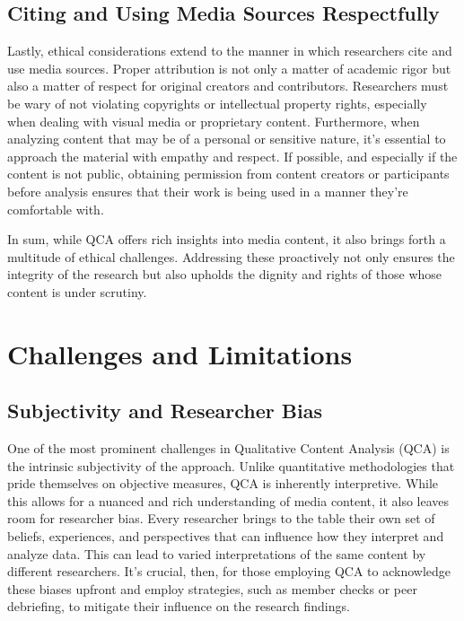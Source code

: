 \documentclass[
  b5paper]{book}
\begin{document}
\hypertarget{citing-and-using-media-sources-respectfully}{%
\subsection*{Citing and Using Media Sources Respectfully}\label{citing-and-using-media-sources-respectfully}}

Lastly, ethical considerations extend to the manner in which researchers cite and use media sources. Proper attribution is not only a matter of academic rigor but also a matter of respect for original creators and contributors. Researchers must be wary of not violating copyrights or intellectual property rights, especially when dealing with visual media or proprietary content. Furthermore, when analyzing content that may be of a personal or sensitive nature, it's essential to approach the material with empathy and respect. If possible, and especially if the content is not public, obtaining permission from content creators or participants before analysis ensures that their work is being used in a manner they're comfortable with.

In sum, while QCA offers rich insights into media content, it also brings forth a multitude of ethical challenges. Addressing these proactively not only ensures the integrity of the research but also upholds the dignity and rights of those whose content is under scrutiny.

\hypertarget{challenges-and-limitations}{%
\section{Challenges and Limitations}\label{challenges-and-limitations}}

\hypertarget{subjectivity-and-researcher-bias}{%
\subsection*{Subjectivity and Researcher Bias}\label{subjectivity-and-researcher-bias}}

One of the most prominent challenges in Qualitative Content Analysis (QCA) is the intrinsic subjectivity of the approach. Unlike quantitative methodologies that pride themselves on objective measures, QCA is inherently interpretive. While this allows for a nuanced and rich understanding of media content, it also leaves room for researcher bias. Every researcher brings to the table their own set of beliefs, experiences, and perspectives that can influence how they interpret and analyze data. This can lead to varied interpretations of the same content by different researchers. It's crucial, then, for those employing QCA to acknowledge these biases upfront and employ strategies, such as member checks or peer debriefing, to mitigate their influence on the research findings.
\end{document}
